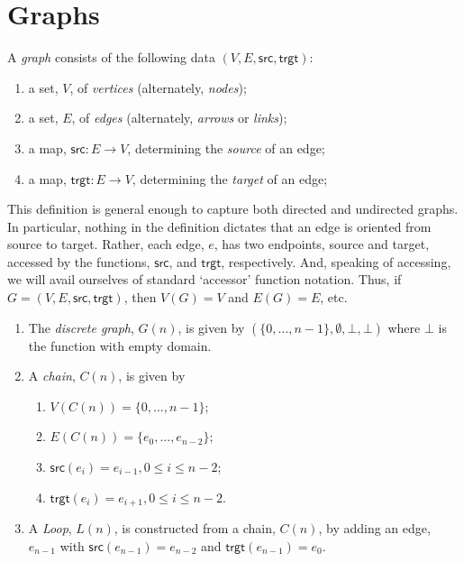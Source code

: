 \section{Graphs}

\begin{definition}
  A \emph{graph} consists of the following data $(V,E,\textsf{src},\textsf{trgt})$:
  \begin{enumerate}
    \item a set, $V$, of \emph{vertices} (alternately, \emph{nodes});
    \item a set, $E$, of \emph{edges} (alternately, \emph{arrows} or \emph{links});
    \item a map, $\textsf{src}:E \to V$, determining the \emph{source} of an edge;
    \item a map, $\textsf{trgt}:E \to V$, determining the \emph{target} of an edge;
  \end{enumerate}
\end{definition}

This definition is general enough to capture both directed and
undirected graphs. In particular, nothing in the definition dictates
that an edge is oriented from source to target. Rather, each edge,
$e$, has two endpoints, source and target, accessed by the functions,
$\textsf{src}$, and $\textsf{trgt}$, respectively. And, speaking of
accessing, we will avail ourselves of standard `accessor' function
notation. Thus, if $G = (V,E,\textsf{src},\textsf{trgt})$, then $V(G)
= V$ and $E(G) = E$, etc.

\begin{example} \label{seqex}
  \begin{enumerate}
  \item The \emph{discrete graph}, $G(n)$, is given by
  $(\{0,...,n-1\},\emptyset,\bot,\bot)$ where $\bot$ is the function
  with empty domain.

  \item A \emph{chain}, $C(n)$, is given by 
  \begin{enumerate}
    \item $V(C(n)) = \{0,...,n-1\}$;
    \item $E(C(n)) = \{e_0,...,e_{n-2}\}$;
    \item $\textsf{src}(e_i)=e_{i-1}, 0 \leq i \leq n-2$;
    \item $\textsf{trgt}(e_i)=e_{i+1},0 \leq i \leq n-2$.
  \end{enumerate}

  \item A \emph{Loop}, $L(n)$, is constructed from a chain,
  $C(n)$, by adding an edge, $e_{n-1}$ with
  $\textsf{src}(e_{n-1})=e_{n-2}$ and $\textsf{trgt}(e_{n-1})=e_{0}$.
  \end{enumerate}
\end{example}

